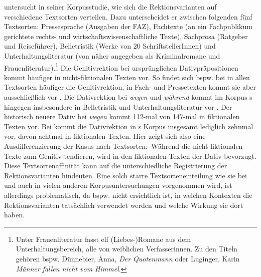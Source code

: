 \citet[]{DiMeola2000} untersucht in seiner Korpusstudie, wie sich die Rektionsvarianten auf verschiedene Textsorten verteilen. 
Dazu unterscheidet er zwischen folgenden fünf Textsorten: Pressesprache (Ausgaben der FAZ), Fachtexte (an ein Fachpublikum gerichtete rechts- und wirtschaftswissenschaftliche Texte), Sachprosa (Ratgeber und Reiseführer), Belletristik (Werke von 20 SchriftstellerInnen) und Unterhaltungsliteratur (von \citeauthor{DiMeola2000} näher angegeben als Kriminalromane und Frauenliteratur).\footnote{Unter Frauenliteratur fasst \citet{DiMeola2000} elf (Liebes-)Romane aus dem Unterhaltungsbereich, alle von weiblichen Verfasserinnen. Zu den Titeln gehören bspw. Dünnebier, Anna, \textit{Der Quotenmann} oder Luginger, Karin \textit{Männer fallen nicht vom Himmel}.} 
Die Genitivrektion bei ursprünglichen Dativpräpositionen kommt häufiger in nicht-fiktionalen Texten vor. 
So findet sich bspw. bei \dank{} in allen Textsorten häufiger die Genitivrektion, in Fach- und Pressetexten kommt sie aber ausschließlich vor \citep[s.][212]{DiMeola2000}. 
Die Dativrektion bei \textit{wegen }und \textit{w{\"a}hrend }kommt im Korpus \citeauthor{DiMeola2000}s hingegen insbesondere in Belletristik und Unterhaltungsliteratur vor \citep[s.][210]{DiMeola2000}. 
Der historisch neuere Dativ bei \textit{wegen }kommt 112-mal von 147-mal in fiktionalen Texten vor. 
Bei \waehrend{} kommt die Dativrektion in \citeauthor{DiMeola2000}s Korpus insgesamt lediglich zehnmal vor, davon achtmal in fiktionalen Texten. 
Hier zeigt sich also eine Ausdifferenzierung der Kasus nach Textsorten:~W{\"a}hrend die nicht-fiktionalen Texte zum Genitiv tendieren, wird in den fiktionalen Texten der Dativ bevorzugt.
Diese Textsortenaffinität kann auf die unterschiedliche Registrierung der Rektionsvarianten hindeuten. 
Eine solch starre Textsorteneinteilung wie sie bei \citet{DiMeola2000} und auch in vielen anderen Korpusuntersuchungen vorgenommen wird, ist allerdings problematisch, da bspw. nicht ersichtlich ist, in welchen Kontexten die Rektionsvarianten tatsächlich verwendet werden und welche Wirkung sie dort haben. 

